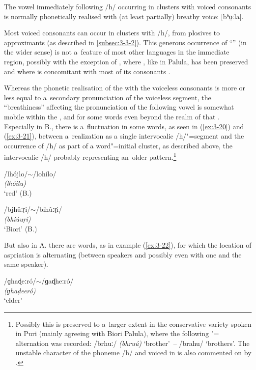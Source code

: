 The vowel immediately following /h/ occurring in clusters with voiced consonants is normally phonetically realised with (at least partially) breathy voice: [bʱo̤ːla]. 


Most voiced consonants can occur in clusters with /h/, from plosives to approximants (as described in \ref{subsec:3-3-2}). This generous occurrence of ``'' (in the wider sense) is not a~feature of most other languages in the immediate region, possibly with the exception of , where  , like in Palula, has been preserved and where  is concomitant with most of its consonants \citep[19--25]{hallberghallberg1999}. 


Whereas the phonetic realisation of the  with the voiceless consonants is more or less equal to a~secondary pronunciation of the voiceless segment, the ``breathiness'' affecting the pronunciation of the following vowel is somewhat mobile within the , and for some words even beyond the realm of that . Especially in B., there is a~fluctuation in some words, as seen in (\ref{ex:3-20}) and (\ref{ex:3-21}), between a~realization as a single intervocalic /h/"=segment and the occurrence of /h/ as part of a word"=initial cluster, as described above, the intervocalic /h/ probably representing an~older pattern.\footnote{Possibly this is preserved to a~larger extent in the conservative variety spoken in Puri (mainly agreeing with Biori Palula), where the following "= alternation was recorded: /brhuː/ \textit{(bhruú)} `brother'~-- /brahu/ `brothers'. The unstable character of the phoneme /h/ and voiced  in  is also commented on by \citet[50]{morchheegaard1997}.}

\begin{exe}
\extab
\label{ex:3-20}
/lhójlo/$\sim$/lohílo/ \\
\textit{(lhóilu)} \\
`red' (B.)

\extab
\label{ex:3-21}
/bjhûːɽi/$\sim$/bihûːɽi/ \\
\textit{(bhiúuṛi)} \\
`Biori' (B.)
\end{exe}

But also in A. there are words, as in example (\ref{ex:3-22}), for which the location of aspriation is alternating (between speakers and possibly even with one and the same speaker).

\begin{exe}
\extab
\label{ex:3-22}
/ɡhaɖeːró/$\sim$/ɡaɖheːró/ \\
\textit{(ɡhaḍeeró)} \\
`elder'
\end{exe}

